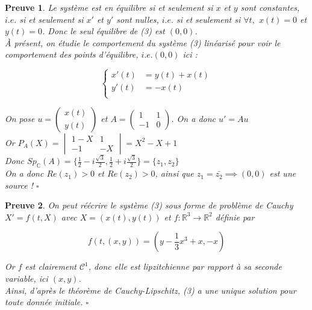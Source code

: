 \documentclass{article}
\newtheorem{preuve}{Preuve}
\begin{document}
\begin{preuve}

\medskip

Le système est en équilibre si et seulement si $x$ et $y$ sont constantes, $i.e.$ 
si et seulement si $x'$ et $y'$ sont nulles, $i.e.$ 
si et seulement si $ \forall t,$ $x(t)=0$ et $y(t)=0$. Donc le seul équilibre de (3) est $(0,0)$.
\\À présent, on étudie le comportement du système (3) linéarisé pour voir le comportement des points d'équilibre, $i.e. (0,0)$ ici :

\begin{equation*}
    \left\{
    \begin{aligned}
        x'(t) &= y(t) + x(t) \\   
        y'(t) &= -x(t)\\
   \end{aligned}
   \right.
\end{equation*}

On pose $u =\begin{pmatrix}x(t)\\y(t)\end{pmatrix}$ et $A=\begin{pmatrix}1 & 1\\-1 & 0\end{pmatrix}$. On a donc $u' = Au$
\smallskip
\\Or $P_A(X)=\begin{vmatrix}1-X & 1\\-1 & -X\end{vmatrix} = X^2-X+1$
\smallskip
\\Donc $Sp_\mathbb{C}(A) = \{ \frac{1}{2} - i \frac{\sqrt{3}}{2}, \frac{1}{2} + i \frac{\sqrt{3}}{2} \} = \{z_1,z_2\}$
\smallskip
\\On a donc $Re(z_1)>0$ et $Re(z_2)>0$, ainsi que $z_1 = \bar{z_2} \implies (0,0)$ est une source ! $\square$   

\end{preuve}

\begin{preuve}
On peut réécrire le système (3) sous forme de problème de Cauchy $X' = f(t,X) $ avec $X=(x(t),y(t))$
et $f:\mathbb{R}^3 \to \mathbb{R}^2$ définie par

\begin{equation}
    f(t,(x,y)) = (y - \frac{1}{3} x^3 + x,-x)
\end{equation}

Or $f$ est clairement $\mathcal{C}^1$, donc elle est lipzitchienne par rapport à sa seconde variable, ici $(x,y)$.
\\Ainsi, d'après le théorème de Cauchy-Lipschitz, (3) a une unique solution pour toute donnée initiale. $\square$
\end{preuve}
\end{document}

